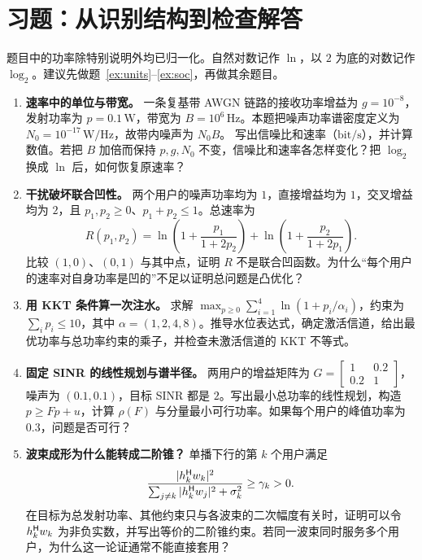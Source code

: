 \chapter{习题：从识别结构到检查解答}
\label{ch:exercises}

题目中的功率除特别说明外均已归一化。自然对数记作 $\ln$，以 $2$ 为底的对数记作 $\log_2$。建议先做题~\ref{ex:units}--\ref{ex:soc}，再做其余题目。

\begin{enumerate}[label=\textbf{\arabic*.},ref=\arabic*,itemsep=10pt]
\item \label{ex:units}\textbf{速率中的单位与带宽。}
一条复基带 AWGN 链路的接收功率增益为 $g=10^{-8}$，发射功率为 $p=0.1\,\mathrm W$，带宽为 $B=10^6\,\mathrm{Hz}$。本题把噪声功率谱密度定义为 $N_0=10^{-17}\,\mathrm{W/Hz}$，故带内噪声为 $N_0B$。
写出信噪比和速率（$\mathrm{bit/s}$），并计算数值。若把 $B$ 加倍而保持 $p,g,N_0$ 不变，信噪比和速率各怎样变化？把 $\log_2$ 换成 $\ln$ 后，如何恢复原速率？

\item \label{ex:nonconcave}\textbf{干扰破坏联合凹性。}
两个用户的噪声功率均为 $1$，直接增益均为 $1$，交叉增益均为 $2$，且 $p_1,p_2\geq0$、$p_1+p_2\leq1$。总速率为
\[
 R(p_1,p_2)=\ln\!\left(1+\frac{p_1}{1+2p_2}\right)
 +\ln\!\left(1+\frac{p_2}{1+2p_1}\right).
\]
比较 $(1,0)$、$(0,1)$ 与其中点，证明 $R$ 不是联合凹函数。为什么“每个用户的速率对自身功率是凹的”不足以证明总问题是凸优化？

\item \label{ex:water}\textbf{用 KKT 条件算一次注水。}
求解 $\max_{p\geq0}\sum_{i=1}^4\ln(1+p_i/\alpha_i)$，约束为 $\sum_i p_i\leq10$，其中 $\alpha=(1,2,4,8)$。推导水位表达式，确定激活信道，给出最优功率与总功率约束的乘子，并检查未激活信道的 KKT 不等式。

\item \label{ex:power}\textbf{固定 SINR 的线性规划与谱半径。}
两用户的增益矩阵为 $G=\left[\begin{smallmatrix}1&0.2\\0.2&1\end{smallmatrix}\right]$，噪声为 $(0.1,0.1)$，目标 SINR 都是 $2$。写出最小总功率的线性规划，构造 $p\geq Fp+u$，计算 $\rho(F)$ 与分量最小可行功率。如果每个用户的峰值功率为 $0.3$，问题是否可行？

\item \label{ex:soc}\textbf{波束成形为什么能转成二阶锥？}
单播下行的第 $k$ 个用户满足
\[
 \frac{|h_k^{\mathsf H}w_k|^2}{\sum_{j\ne k}|h_k^{\mathsf H}w_j|^2+\sigma_k^2}\geq\gamma_k>0.
\]
在目标为总发射功率、其他约束只与各波束的二次幅度有关时，证明可以令 $h_k^{\mathsf H}w_k$ 为非负实数，并写出等价的二阶锥约束。若同一波束同时服务多个用户，为什么这一论证通常不能直接套用？


\end{enumerate}
